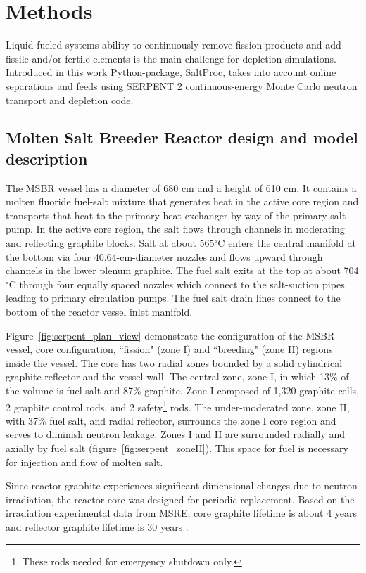 \section{Methods}

Liquid-fueled systems ability to continuously remove fission products and add 
fissile and/or fertile elements is the main challenge for depletion simulations. 
Introduced in this work Python-package, SaltProc, takes into account online 
separations and feeds using SERPENT 2 continuous-energy Monte Carlo neutron 
transport and depletion code.

\subsection{Molten Salt Breeder Reactor design and model description}
The \gls{MSBR} vessel has a diameter of 680 cm and a height of 610 cm. It 
contains a molten fluoride fuel-salt mixture that generates heat in the active 
core region and transports that heat to the primary heat exchanger by way of the 
primary salt pump. In the active core region, the salt flows through channels in 
moderating and reflecting graphite blocks. Salt at about 565$^{\circ}$C enters 
the central manifold at the bottom via four 40.64-cm-diameter nozzles and flows 
upward through channels in the lower plenum graphite. The fuel salt exits at the 
top at about 704$^{\circ}$C through four equally spaced nozzles which connect to 
the salt-suction pipes leading to primary circulation pumps. The fuel salt drain 
lines connect to the bottom of the reactor vessel inlet manifold.

Figure~\ref{fig:serpent_plan_view} demonstrate the configuration of the 
\gls{MSBR} vessel, core configuration, ``fission" (zone I) and ``breeding" (zone 
II) regions inside the vessel. The core has two radial zones bounded by a solid 
cylindrical graphite reflector and the vessel wall. The central zone, zone I, in 
which 13\% of the volume is fuel salt and 87\% graphite. Zone I composed of 
1,320 graphite cells, 2 graphite control rods, and 2 safety\footnote{ These rods 
needed for emergency shutdown only.} rods. The under-moderated zone, zone II, 
with 37\% fuel salt, and radial reflector, surrounds the zone I core region and 
serves to diminish neutron leakage. Zones I and II are surrounded radially and 
axially by fuel salt (figure~\ref{fig:serpent_zoneII}). This space for fuel is 
necessary for injection and flow of molten salt.

Since reactor graphite experiences significant dimensional changes due to 
neutron irradiation, the reactor core was designed for periodic replacement. 
Based on the irradiation experimental data from \gls{MSRE}, core graphite 
lifetime is about 4 years and reflector graphite lifetime is 30 years 
\cite{robertson_conceptual_1971}.

